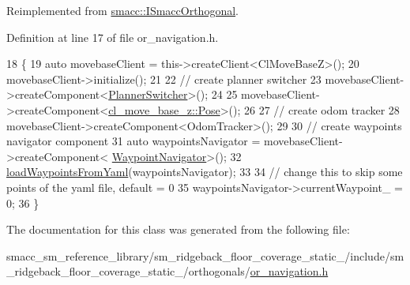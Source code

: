 Reimplemented from \hyperlink{classsmacc_1_1ISmaccOrthogonal_a6bb31c620cb64dd7b8417f8705c79c7a}{smacc\+::\+I\+Smacc\+Orthogonal}.



Definition at line 17 of file or\+\_\+navigation.\+h.


\begin{DoxyCode}
18     \{
19         \textcolor{keyword}{auto} movebaseClient = this->createClient<ClMoveBaseZ>();
20         movebaseClient->initialize();
21 
22         \textcolor{comment}{// create planner switcher}
23         movebaseClient->createComponent<\hyperlink{classcl__move__base__z_1_1PlannerSwitcher}{PlannerSwitcher}>();
24 
25         movebaseClient->createComponent<\hyperlink{classcl__move__base__z_1_1Pose}{cl\_move\_base\_z::Pose}>();
26 
27         \textcolor{comment}{// create odom tracker}
28         movebaseClient->createComponent<OdomTracker>();
29 
30         \textcolor{comment}{// create waypoints navigator component}
31         \textcolor{keyword}{auto} waypointsNavigator = movebaseClient->createComponent<
      \hyperlink{classcl__move__base__z_1_1WaypointNavigator}{WaypointNavigator}>();
32         \hyperlink{classsm__ridgeback__floor__coverage__static__1_1_1OrNavigation_a32f658f3d1ed7724f13fd30eb2139bbb}{loadWaypointsFromYaml}(waypointsNavigator);
33 
34         \textcolor{comment}{// change this to skip some points of the yaml file, default = 0}
35         waypointsNavigator->currentWaypoint\_ = 0;
36     \}
\end{DoxyCode}


The documentation for this class was generated from the following file\+:\begin{DoxyCompactItemize}
\item 
smacc\+\_\+sm\+\_\+reference\+\_\+library/sm\+\_\+ridgeback\+\_\+floor\+\_\+coverage\+\_\+static\+\_/include/sm\+\_\+ridgeback\+\_\+floor\+\_\+coverage\+\_\+static\+\_/orthogonals/\hyperlink{sm__ridgeback__floor__coverage__static__1_2include_2sm__ridgeback__floor__coverage__static__1_2orthogonals_2or__navigation_8h}{or\+\_\+navigation.\+h}\end{DoxyCompactItemize}

